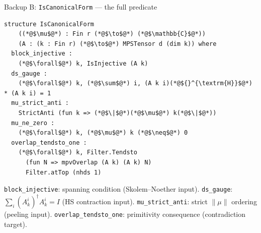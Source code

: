 \documentclass[aspectratio=169,10pt]{beamer}
\begin{document}
\begin{frame}[fragile]{Backup B: \texttt{IsCanonicalForm} --- the full predicate}
    \vspace{-0.6em}

    \begin{lstlisting}
structure IsCanonicalForm
    ((*@$\mu$@*) : Fin r (*@$\to$@*) (*@$\mathbb{C}$@*))
    (A : (k : Fin r) (*@$\to$@*) MPSTensor d (dim k)) where
  block_injective :
    (*@$\forall$@*) k, IsInjective (A k)
  ds_gauge :
    (*@$\forall$@*) k, (*@$\sum$@*) i, (A k i)(*@${}^{\textrm{H}}$@*) * (A k i) = 1
  mu_strict_anti :
    StrictAnti (fun k => (*@$\|$@*)(*@$\mu$@*) k(*@$\|$@*))
  mu_ne_zero :
    (*@$\forall$@*) k, (*@$\mu$@*) k (*@$\neq$@*) 0
  overlap_tendsto_one :
    (*@$\forall$@*) k, Filter.Tendsto
      (fun N => mpvOverlap (A k) (A k) N)
      Filter.atTop (nhds 1)
\end{lstlisting}

    \vspace{-0.2em}
    \textcolor{dimwhite}{\footnotesize
        \texttt{block\_injective}: spanning condition (Skolem--Noether input).
        \texttt{ds\_gauge}: $\sum_i (A_k^i)^\dagger A_k^i = I$ (HS contraction input).
        \texttt{mu\_strict\_anti}: strict $\|\mu\|$ ordering (peeling input).
        \texttt{overlap\_tendsto\_one}: primitivity consequence (contradiction target).}
\end{frame}
\end{document}
